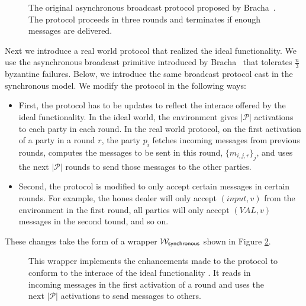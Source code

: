 \begin{figure}
	
	\label{fig:protocol:asyncbracha}
	\caption{The original asynchronous broadcast protocol proposed by Bracha~\cite{bracha-broadcast}. The protocol proceeds in three rounds and terminates if enough messages are delivered.}
\end{figure}

Next we introduce a real world protocol that realized the ideal functionality.
We use the asynchronous broadcast primitive introduced by Bracha~\cite{bracha-broadcast} that tolerates $\frac{n}{3}$ byzantine failures.
Below, we introduce the same broadcast protocol cast in the synchronous model.
We modify the protocol in the following ways:

\begin{itemize}
	\item First, the protocol has to be updates to reflect the interace offered by the ideal functionality. In the ideal world, the environment gives $|\mathcal{P}|$ activations to each party in each round. In the real world protocol, on the first activation of a party in a round $r$, the party $p_i$ fetches incoming messages from previous rounds, computes the messages to be sent in this round, $\{m_{i,j,r}\}_{j}$, and uses the next $|\mathcal{P}|$ rounds to send those messages to the other parties.
	\item Second, the protocol is modified to only accept certain messages in certain rounds. For example, the hones dealer will only accept $(input,v)$ from the environment in the first round, all parties will only accept $(VAL,v)$ messages in the second tound, and so on.
\end{itemize}

These changes take the form of a wrapper $\mathcal{W}_{{\mathsf {synchronous}}}$ shown in Figure \ref{fig:wrapper:synchronous}.

\begin{figure}
	
	\label{fig:wrapper:synchronous}
	\caption{This wrapper implements the enhancements made to the protocol to conform to the interace of the ideal functionality \Fbc. It reads in incoming messages in the first activation of a round and uses the next $|\mathcal{P}|$ activations to send messages to others.}
\end{figure}

\begin{figure}[!h]
	
\end{figure}
\begin{figure}
	
\end{figure}

